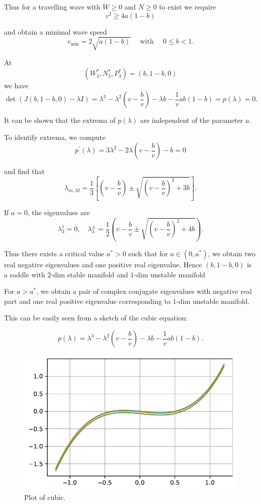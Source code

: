 \documentclass[
  letterpaper,
  DIV=11,
  numbers=noendperiod]{scrreprt}
\theoremstyle{plain}
\theoremstyle{definition}
\theoremstyle{plain}
\theoremstyle{remark}
\begin{document}
Thus for a travelling wave with \(W\geq 0\) and \(N \geq 0\) to exist we
require \[
v^2 \geq  4 a(1-b)
\]

and obtain a minimal wave speed \[
v_\text{min}=2\sqrt{a(1-b)}   \quad \text{ with } \quad  0\leq b<1.
\]

At \[
(W^\ast_3, N^\ast_3, P^\ast_3) =(b, 1-b, 0)
\] we have \[
\det(J(b,1-b,0) - \lambda I)= \lambda^3 - \lambda^2(v- \frac b v) - \lambda b - \frac 1 v ab(1-b) = p(\lambda) =0.
\]

It can be shown that the extrema of \(p(\lambda)\) are independent of
the parameter \(a\).

To identify extrema, we compute \[
p^\prime(\lambda) = 3 \lambda^2 - 2 \lambda \left( v - \frac b v\right) - b = 0
\]

and find that \[
\lambda_{m,M}= \frac 13 \left[ \left(v - \frac bv \right) \pm \sqrt{ \left(v - \frac bv\right) ^2 + 3 b } \right].
\]

If \(a=0\), the eigenvalues are \[
\lambda_3^1 = 0, \quad \lambda_3^\pm = \frac 12 \left( v - \frac bv \pm \sqrt{\left(v - \frac bv\right)^2 + 4 b} \right).
\]

Thus there exists a critical value \(a^\ast>0\) such that for
\(a \in (0, a^\ast)\), we obtain two real negative eigenvalues and one
positive real eigenvalue. Hence \((b, 1-b, 0)\) is a saddle with
\(2\)-dim stable manifold and \(1\)-dim unstable manifold

For \(a>a^\ast\), we obtain a pair of complex conjugate eigenvalues with
negative real part and one real positive eigenvalue corresponding to
\(1\)-dim unstable manifold.

This can be easily seen from a sketch of the cubic equation:

\[
p(\lambda) = \lambda^3 - \lambda^2(v- \frac b v) - \lambda b - \frac 1 v ab(1-b).
\]

\begin{figure}

{\centering \includegraphics{LotkaVolteraPDE_files/figure-pdf/fig-cubic-output-1.pdf}

}

\caption{\label{fig-cubic}Plot of cubic.}

\end{figure}
\end{document}
